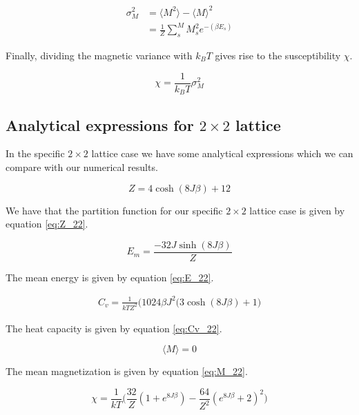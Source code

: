 \documentclass{article}
\begin{document}
\begin{multicols}{2}
\begin{equation}
\begin{split}
\sigma_M^2&=\langle M^2 \rangle-\langle M \rangle^2 \\
& = \frac{1}{Z}\sum_s^M M_s^2 e^{-(\beta E_s)}
\end{split}
\label{eq:M_v}
\end{equation}

Finally, dividing the magnetic variance with $k_B T$ gives rise to the susceptibility $\chi$.

\begin{equation}
\chi = \frac{1}{k_BT}\sigma_M^2
\label{eq:chi}
\end{equation}

\subsection{Analytical expressions for $2\times2$ lattice}

In the specific $2\times2$ lattice case we have some analytical expressions which we can compare with our numerical results.

\begin{equation}
Z=4\cosh{(8J\beta)}+12
\label{eq:Z_22}
\end{equation}

We have that the partition function for our specific $2\times2$ lattice case is given by equation \ref{eq:Z_22}.

\begin{equation}
E_m=\frac{-32J\sinh{(8J\beta)}}{Z}
\label{eq:E_22}
\end{equation}

The mean energy is given by equation \ref{eq:E_22}.

\begin{equation}
\begin{split}
C_v = \frac{1}{kTZ^2} \bigg(1024\beta J^2(3\cosh(8J\beta) + 1\bigg)
\end{split}
\label{eq:Cv_22}
\end{equation}

The heat capacity is given by equation \ref{eq:Cv_22}.

\begin{equation}
\langle M \rangle=0
\label{eq:M_22}
\end{equation}

The mean magnetization is given by equation \ref{eq:M_22}.

\begin{equation}
\chi = \frac{1}{kT} \bigg(\frac{32}{Z}(1+e^{8J\beta})-\frac{64}{Z^2}(e^{8J\beta}+2)^2\bigg)
\label{eq:chi_22}
\end{equation}


\end{multicols}
\end{document}
